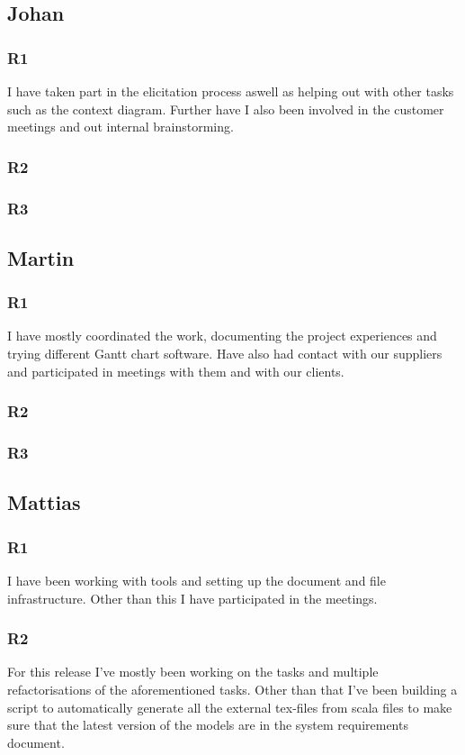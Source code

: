 \documentclass[a4paper]{article}
\begin{document}
  \subsection{Johan}
    \subsubsection{R1}
    I have taken part in the elicitation process aswell as helping out with other tasks such as the context diagram. Further have I also been involved in the customer meetings and out internal brainstorming.
    \subsubsection{R2}
    \subsubsection{R3}
  
  \subsection{Martin}
    \subsubsection{R1}
    I have mostly coordinated the work, documenting the project experiences and trying different Gantt chart software. Have also had contact with our suppliers and participated in meetings with them and with our clients.
    \subsubsection{R2}
    \subsubsection{R3}
  
  \subsection{Mattias}
    \subsubsection{R1}
    I have been working with tools and setting up the document and file infrastructure. Other than this I have participated in the meetings.
    \subsubsection{R2}
	For this release I've mostly been working on the tasks and multiple refactorisations of the aforementioned tasks. Other than that I've been building a script to automatically generate all the external tex-files from scala files to make sure that the latest version of the models are in the system requirements document.
\end{document}
